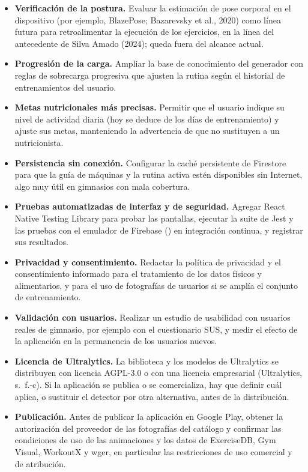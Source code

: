 \begin{itemize}
    máquina real (Google for Developers, s.~f.-f). Revisiones
    del campo (Azuma et al., 2001; Billinghurst et al., 2015) señalan el
    registro preciso y el seguimiento como los problemas técnicos centrales,
    por lo que cada línea debe evaluarse con medidas de latencia y estabilidad
    en un dispositivo físico antes de afirmar que se logró el registro
    tridimensional.
    \item \textbf{Verificación de la postura.} Evaluar la estimación de pose
    corporal en el dispositivo (por ejemplo, BlazePose; Bazarevsky et al.,
    2020) como línea futura para retroalimentar la ejecución de los
    ejercicios, en la línea del antecedente de Silva Amado (2024); queda fuera
    del alcance actual.
    \item \textbf{Progresión de la carga.} Ampliar la base de conocimiento del
    generador con reglas de sobrecarga progresiva que ajusten la rutina según
    el historial de entrenamientos del usuario.
    \item \textbf{Metas nutricionales más precisas.} Permitir que el usuario
    indique su nivel de actividad diaria (hoy se deduce de los días de
    entrenamiento) y ajuste sus metas, manteniendo la advertencia de que no
    sustituyen a un nutricionista.
    \item \textbf{Persistencia sin conexión.} Configurar la caché persistente
    de Firestore para que la guía de máquinas y la rutina activa estén
    disponibles sin Internet, algo muy útil en gimnasios con mala cobertura.
    \item \textbf{Pruebas automatizadas de interfaz y de seguridad.} Agregar
    React Native Testing Library para probar las pantallas, ejecutar la suite de
    Jest y las pruebas con el emulador de Firebase () en integración continua, y registrar sus resultados.
    \item \textbf{Privacidad y consentimiento.} Redactar la política de
    privacidad y el consentimiento informado para el tratamiento de los datos
    físicos y alimentarios, y para el uso de fotografías de usuarios si se
    amplía el conjunto de entrenamiento.

    \item \textbf{Validación con usuarios.} Realizar un estudio de usabilidad
    con usuarios reales de gimnasio, por ejemplo con el cuestionario SUS, y
    medir el efecto de la aplicación en la permanencia de los usuarios nuevos.
    \item \textbf{Licencia de Ultralytics.} La biblioteca y los modelos de
    Ultralytics se distribuyen con licencia AGPL-3.0 o con una licencia
    empresarial (Ultralytics, s.~f.-c). Si la aplicación se publica o se
    comercializa, hay que definir cuál aplica, o sustituir el detector por otra
    alternativa, antes de la distribución.
    \item \textbf{Publicación.} Antes de publicar la aplicación en Google
    Play, obtener la autorización del proveedor de las fotografías del
    catálogo y confirmar las condiciones de uso de las animaciones y los
    datos de ExerciseDB, Gym Visual, WorkoutX y wger, en particular las
    restricciones de uso comercial y de atribución.
\end{itemize}
